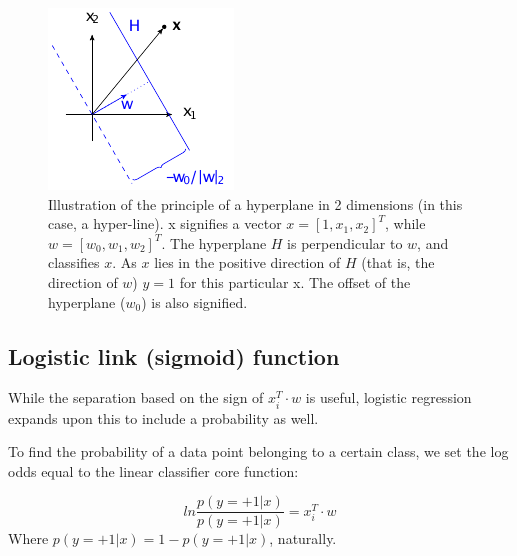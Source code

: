 \documentclass[%
 reprint,
 amsmath,amssymb,
 aps,
]{revtex4-1}
\begin{document}
\begin{figure}
  \includegraphics[width=\linewidth]{../figs/hyperplane}
  \caption{
  Illustration of the principle of a hyperplane in 2 dimensions (in this case, a hyper-line).
  x signifies a vector $x = [ 1, x_1, x_2 ]^T$, while $w = [ w_0, w_1, w_2 ]^T$.
  The hyperplane $H$ is perpendicular to $w$, and classifies $x$.
  As $x$ lies in the positive direction of $H$ (that is, the direction of $w$) $y=1$ for this particular x.
  The offset of the hyperplane ($w_0$) is also signified.
  }
  \label{hyperplane}
\end{figure}

\subsection{Logistic link (sigmoid) function}
While the separation based on the sign of $x_{i}^T\cdot w$ is useful, logistic regression expands upon this to include a probability as well.

To find the probability of a data point belonging to a certain class, we set the log odds equal to the linear classifier core function:

\[
ln \frac{p(y = +1|x)}{p(y = +1|x)} = x_{i}^T\cdot w
\]
Where $p(y = +1|x) = 1 - p(y = +1|x)$, naturally.
\end{document}
